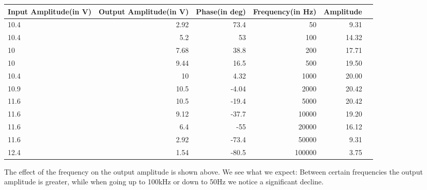 \begin{adjustwidth}{-2.5 cm}{-2.5 cm}\centering\begin{threeparttable}[!htb]
        \scriptsize
        \begin{tabular}{lrrrrr}\toprule
            \textbf{Input Amplitude(in V)} & \textbf{Output Amplitude(in V)} & \textbf{Phase(in deg)} & \textbf{Frequency(in Hz)} & \textbf{Amplitude} \\\midrule
            10.4                           & 2.92                            & 73.4                   & 50                        & 9.31               \\
            10.4                           & 5.2                             & 53                     & 100                       & 14.32              \\
            10                             & 7.68                            & 38.8                   & 200                       & 17.71              \\
            10                             & 9.44                            & 16.5                   & 500                       & 19.50              \\
            10.4                           & 10                              & 4.32                   & 1000                      & 20.00              \\
            10.9                           & 10.5                            & -4.04                  & 2000                      & 20.42              \\
            11.6                           & 10.5                            & -19.4                  & 5000                      & 20.42              \\
            11.6                           & 9.12                            & -37.7                  & 10000                     & 19.20              \\
            11.6                           & 6.4                             & -55                    & 20000                     & 16.12              \\
            11.6                           & 2.92                            & -73.4                  & 50000                     & 9.31               \\
            12.4                           & 1.54                            & -80.5                  & 100000                    & 3.75               \\
            \bottomrule
        \end{tabular}
        \caption{The effect of the frequency on the output amplitude is shown above. We see what we expect: Between certain frequencies the output amplitude is greater, while when going up to 100kHz or down to 50Hz we notice a significant decline.}
    \end{threeparttable}\end{adjustwidth}